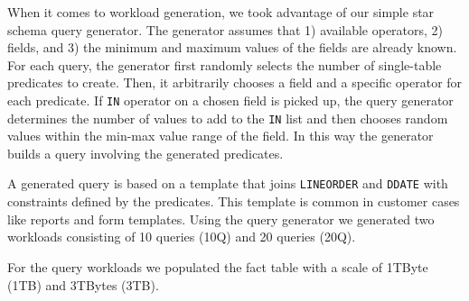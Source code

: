 \documentclass[paper]{ieice}
\begin{document}
When it comes to workload generation, we took advantage of 
our simple star schema query \hbox{generator}. 
The generator assumes that 1) available operators, 2) fields, 
and 3) the minimum and \hbox{maximum} values of the fields are already known. 
For each query, the generator first randomly selects the number of single-table 
predicates to create. 
Then, it arbitrarily chooses a field and a specific operator 
for each predicate. 
If {\tt IN} operator on a chosen field is picked up, the query generator 
determines the number of values to add to the {\tt IN} list and then chooses random values within the min-max value 
range of the field. 
In this way the generator builds a query involving the generated predicates.

A generated query is based on a template that joins {\tt LINEORDER} and {\tt DDATE} with constraints defined by the predicates. 
This template is common in customer cases like reports and form 
templates. 
Using the query generator we generated two workloads consisting of 10 queries (10Q) and 20 queries (20Q). 

For the query workloads we populated the fact table with a scale of 1TByte (1TB) and 3TBytes (3TB).
\end{document}
